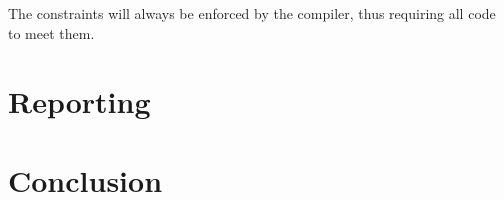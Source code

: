 \documentclass[a4paper,10pt]{article}
\begin{document}
The constraints will always be enforced by the compiler, thus requiring all code to meet them.






\section{Reporting}

\section{Conclusion}




\end{document}
